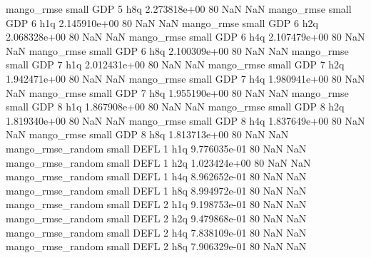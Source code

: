        mango_rmse      small      GDP                 5                  h8q 2.273818e+00 80            NaN                NaN
       mango_rmse      small      GDP                 6                  h1q 2.145910e+00 80            NaN                NaN
       mango_rmse      small      GDP                 6                  h2q 2.068328e+00 80            NaN                NaN
       mango_rmse      small      GDP                 6                  h4q 2.107479e+00 80            NaN                NaN
       mango_rmse      small      GDP                 6                  h8q 2.100309e+00 80            NaN                NaN
       mango_rmse      small      GDP                 7                  h1q 2.012431e+00 80            NaN                NaN
       mango_rmse      small      GDP                 7                  h2q 1.942471e+00 80            NaN                NaN
       mango_rmse      small      GDP                 7                  h4q 1.980941e+00 80            NaN                NaN
       mango_rmse      small      GDP                 7                  h8q 1.955190e+00 80            NaN                NaN
       mango_rmse      small      GDP                 8                  h1q 1.867908e+00 80            NaN                NaN
       mango_rmse      small      GDP                 8                  h2q 1.819340e+00 80            NaN                NaN
       mango_rmse      small      GDP                 8                  h4q 1.837649e+00 80            NaN                NaN
       mango_rmse      small      GDP                 8                  h8q 1.813713e+00 80            NaN                NaN
mango_rmse_random      small     DEFL                 1                  h1q 9.776035e-01 80            NaN                NaN
mango_rmse_random      small     DEFL                 1                  h2q 1.023424e+00 80            NaN                NaN
mango_rmse_random      small     DEFL                 1                  h4q 8.962652e-01 80            NaN                NaN
mango_rmse_random      small     DEFL                 1                  h8q 8.994972e-01 80            NaN                NaN
mango_rmse_random      small     DEFL                 2                  h1q 9.198753e-01 80            NaN                NaN
mango_rmse_random      small     DEFL                 2                  h2q 9.479868e-01 80            NaN                NaN
mango_rmse_random      small     DEFL                 2                  h4q 7.838109e-01 80            NaN                NaN
mango_rmse_random      small     DEFL                 2                  h8q 7.906329e-01 80            NaN                NaN
